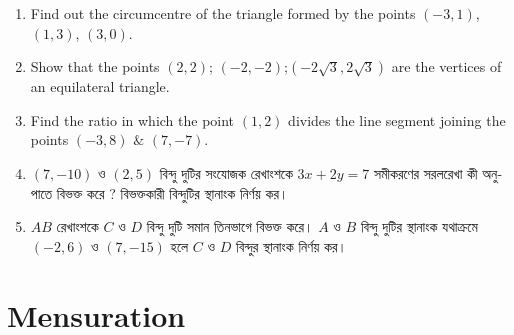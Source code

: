 \documentclass[11pt, a4paper]{article}
\begin{document}
\begin{enumerate}


	\item Find out the circumcentre of the triangle formed by the points $(-3,1)$, $(1,3)$, $(3,0)$.
	
	\item Show that the points $ (2,2) $; $(-2,-2)$;$(-2\sqrt{3},2\sqrt{3})$ are the vertices of an equilateral triangle.
	
	\item Find the ratio in which the point $(1,2)$ divides the line segment joining the points $(-3,8)$ $\&$ $(7,-7)$.
	
	\item $(7, -10)$ \textbengali{ও} $(2, 5)$  \textbengali{বিন্দু দুটির সংযোজক রেখাংশকে}  $3x + 2y = 7$ \textbengali{সমীকরণের সরলরেখা কী অনুপাতে বিভক্ত করে ? বিভক্তকারী বিন্দুটির স্থানাংক নির্ণয় কর।}
	
	\item $AB$ \textbengali{রেখাংশকে} $C$ \textbengali{ও} $D$ \textbengali{বিন্দু দুটি সমান তিনভাগে বিভক্ত করে।} $A$ \textbengali{ও} $B$ \textbengali{বিন্দু দুটির স্থানাংক যথাক্রমে} $(-2, 6)$ \textbengali{ও} $(7, -15)$ \textbengali{হলে} $C$ \textbengali{ও} $D$ \textbengali{বিন্দুর স্থানাংক নির্ণয় কর।}

\end{enumerate}



\section{Mensuration}
\end{document}

